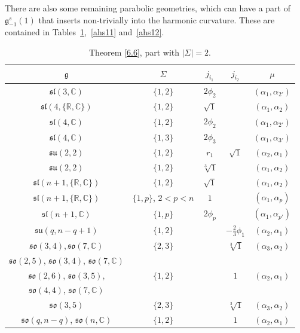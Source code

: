 \documentclass[10pt,a4paper]{amsart}
\newcommand{\Si}{\Sigma}
\newcommand{\fg}{\mathfrak g}
\newcommand{\R}{\mathbb{R}}
\newcommand{\C}{\mathbb{C}}
\numberwithin{equation}{section}
\begin{document}
There are also some remaining parabolic geometries, which can have a part of $\fg_{-1}^s(1)$ that inserts non-trivially into the harmonic curvature. These are contained in Tables~\ref{ahs10},~\ref{ahs11} and~\ref{ahs12}.

\begin{table}[th!]\centering\caption{Theorem \ref{6.6}, part with $|\Si|=2$.}\label{ahs10}\vspace{1mm}

\begin{tabular}{|c|c|c|c|c|}
\hline
$\fg$ & $\Sigma$ & $j_{i_1}$& $j_{i_2}$& $\mu$ \\
\hline
\hline
$\mathfrak{sl}(3,\mathbb{C})$ & $\{1,2\}$ &$2\phi_2$&& $(\alpha_{1},\alpha_{2'})$ \\
\hline
$\mathfrak{sl}(4,\{\R,\C\})$ & $\{1,2\}$ & $\sqrt{1}$ & & $(\alpha_1,\alpha_2)$ \\
\hline
$\mathfrak{sl}(4,\mathbb{C})$ & $\{1,2\}$ &$2\phi_2$&& $(\alpha_{1},\alpha_{2'})$ \\
\hline
$\mathfrak{sl}(4,\mathbb{C})$ & $\{1,3\}$ &$2\phi_3$&& $(\alpha_{1},\alpha_{3'})$ \\
\hline
$\mathfrak{su}(2,2)$&$\{1,2\}$&$r_1$& $\sqrt{1} $& $(\alpha_2,\alpha_{1})$\\
\hline
$\mathfrak{su}(2,2)$&$\{1,2\}$&$ \sqrt[3]{1}$&&$(\alpha_1,\alpha_{2})$ \\
\hline
$\mathfrak{sl}(n+1,\{\R,\C\})$ & $\{1,2\}$ & $\sqrt{1}$ & & $(\alpha_1,\alpha_2)$ \\
\hline
$\mathfrak{sl}(n+1,\{\mathbb{R, C}\})$& $\{1,p\}$, $2<p<n$& $1$& & $(\alpha_1,\alpha_p)$\\
\hline
$\mathfrak{sl}(n+1,\mathbb{C})$ & $\{1,p\}$ &$2\phi_p$&& $(\alpha_{1},\alpha_{p'})$ \\
\hline
$\mathfrak{su}(q,n-q+1)$ &$\{1,2\}$&&$-\frac23\phi_1$&$(\alpha_2,\alpha_1)$\\
\hline
$\mathfrak{so}(3,4), \mathfrak{so}(7,\C)$&$\{ 2,3\}$&&$\sqrt[3]{1}$& $(\alpha_3,\alpha_2)$ \\
\hline
$\mathfrak{so}(2,5)$, $\mathfrak{so}(3,4)$, $\mathfrak{so}(7,\mathbb{C})$& && & \\
$\mathfrak{so}(2,6)$, $\mathfrak{so}(3,5)$,& $\{1,2\}$ &&$1$ & $(\alpha_2,\alpha_1)$\\
$\mathfrak{so}(4,4)$, $\mathfrak{so}(7,\mathbb{C})$& & && \\
\hline
$\mathfrak{so}(3,5)$&$\{2,3\}$& &$\sqrt[3]{1} $&$(\alpha_3,\alpha_2)$\\
\hline
$\mathfrak{so}(q,n-q)$, $\mathfrak{so}(n,\mathbb{C})$& $\{1,2\}$ &&$1$ & $(\alpha_2,\alpha_1)$\\

\end{tabular}
\end{table}
\end{document}
